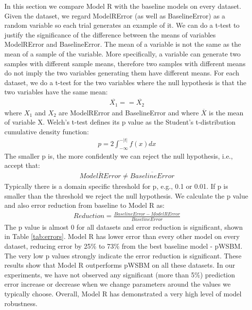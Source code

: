 \documentclass[12pt]{WSUThesis}
\theoremstyle{definition}
\begin{document}
In this section we compare Model R with the baseline models on every dataset.
Given the dataset,
we regard ModelRError (as well as BaselineError) as a random variable
so each trial generates an example of it.
We can do a t-test to justify the significance of the difference between the means of variables ModelRError and BaselineError.
The mean of a variable is not the same as the mean of a sample of the variable.
More specifically, a variable can generate two samples with different sample means,
therefore two samples with different means do not imply the two variables generating them have different means.
For each dataset, we do a t-test for the two variables where the null hypothesis is that the two variables have the same mean:
\begin{align*}
\overline{X_1} == \overline{X_2}
\end{align*}
where $ X_1 $ and $ X_2 $ are ModelRError and BaselineError and
where $ \overline{X} $ is the mean of variable X.
Welch's t-test defines its p value as the Student's t-distribution cumulative density function:
\begin{align*}
p = 2 \int_{-\infty}^{-|t|} f(x) dx
\end{align*}
The smaller p is, the more confidently we can reject the null hypothesis, i.e., accept that:
\begin{align*}
\overline{ModelRError} \neq \overline{BaselineError}
\end{align*}
Typically there is a domain specific threshold for p, e.g., 0.1 or 0.01. If p is smaller than the threshold we reject the null hypothesis.
We calculate the p value and also error reduction from baseline to Model R as:
\begin{align*}
Reduction = \frac{BaselineError - ModelRError}{BaselineError}
\end{align*}
The p value is almost 0 for all datasets and error reduction is significant,
shown in Table \ref{tab:errors}.
Model R has lower error than every other model on every dataset,
reducing error by 25\% to 73\% from the best baseline model - pWSBM.
The very low p values strongly indicate the error reduction is significant.
These results show that Model R outperforms pWSBM on all these datasets.
In our experiments, we have not observed any significant (more than 5\%)
prediction error increase or decrease when we change parameters around the values
we typically choose.
Overall, Model R has demonstrated a very high level of model robustness.
\end{document}
